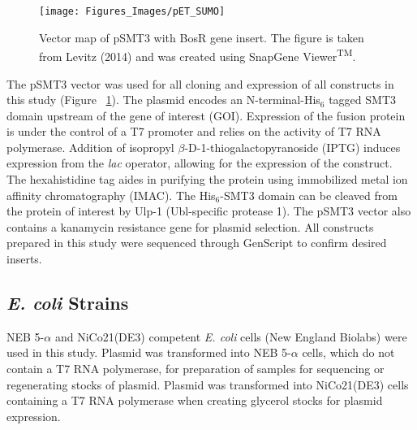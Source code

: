 \documentclass[12pt,twoside]{reedthesis}
\begin{document}
   	\begin{figure}[h]
   		
   		\centering
   		\texttt{[image: Figures\_Images/pET\_SUMO]}
   		\caption[Map of pSMT3-BosR]{Vector map of pSMT3 with BosR gene insert. The figure is taken from Levitz (2014) and was created using SnapGene Viewer\textsuperscript{TM}.}
   		\label{pETSUMOBosR}
   	\end{figure}
   	
   The pSMT3 vector was used for all cloning and expression of all constructs in this study (Figure ~\ref{pETSUMOBosR}). The plasmid encodes an N-terminal-His$_{6}$ tagged SMT3 domain upstream of the gene of interest (GOI). Expression of the fusion protein is under the control of a T7 promoter and relies on the activity of T7 RNA polymerase. Addition of isopropyl $\beta$-D-1-thiogalactopyranoside (IPTG) induces expression from the \textit{lac} operator, allowing for the expression of the construct. The hexahistidine tag aides in purifying the protein using immobilized metal ion affinity chromatography (IMAC). The His$_{6}$-SMT3 domain can be cleaved from the protein of interest by Ulp-1 (Ubl-specific protease 1). The pSMT3 vector also contains a kanamycin resistance gene for plasmid selection. All constructs prepared in this study were sequenced through GenScript\textsuperscript{\textregistered} to confirm desired inserts. 
   
   \subsection{\textit{E. coli} Strains}
   
   NEB 5-$\alpha$ and NiCo21(DE3) competent \textit{E. coli} cells (New England Biolabs) were used in this study. Plasmid was transformed into NEB 5-$\alpha$ cells, which do not contain a T7 RNA polymerase, for preparation of samples for sequencing or regenerating stocks of plasmid. Plasmid was transformed into NiCo21(DE3) cells containing a T7 RNA polymerase when creating glycerol stocks for plasmid expression.
   
\end{document}
